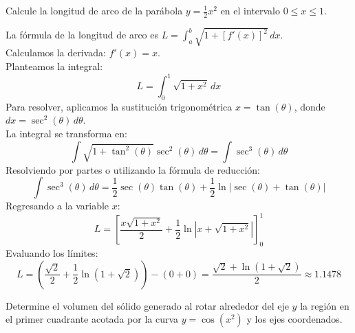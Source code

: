 \documentclass[11pt,paper=a4,answers, addpoints]{exam}
\begin{document}
\begin{questions}

\question Calcule la longitud de arco de la parábola $y = \frac{1}{2}x^2$ en el intervalo $0 \le x \le 1$.

\begin{center}
\end{center}

\begin{solution}
La fórmula de la longitud de arco es $L = \int_a^b \sqrt{1 + [f'(x)]^2} \, dx$. \\
Calculamos la derivada: $f'(x) = x$. \\
Planteamos la integral:
\[ L = \int_0^1 \sqrt{1 + x^2} \, dx \]
Para resolver, aplicamos la sustitución trigonométrica $x = \tan(\theta)$, donde $dx = \sec^2(\theta) \, d\theta$. \\
La integral se transforma en:
\[ \int \sqrt{1 + \tan^2(\theta)} \sec^2(\theta) \, d\theta = \int \sec^3(\theta) \, d\theta \]
Resolviendo por partes o utilizando la fórmula de reducción:
\[ \int \sec^3(\theta) \, d\theta = \frac{1}{2}\sec(\theta)\tan(\theta) + \frac{1}{2}\ln|\sec(\theta) + \tan(\theta)| \]
Regresando a la variable $x$:
\[ L = \left[ \frac{x\sqrt{1+x^2}}{2} + \frac{1}{2}\ln\left|x + \sqrt{1+x^2}\right| \right]_0^1 \]
Evaluando los límites:
\[ L = \left( \frac{\sqrt{2}}{2} + \frac{1}{2}\ln(1+\sqrt{2}) \right) - (0 + 0) = \frac{\sqrt{2} + \ln(1+\sqrt{2})}{2} \approx 1.1478 \]
\end{solution}

\vspace{5mm}

\question Determine el volumen del sólido generado al rotar alrededor del eje $y$ la región en el primer cuadrante acotada por la curva $y = \cos(x^2)$ y los ejes coordenados.

\begin{center}
\end{center}


\end{questions}
\end{document}
